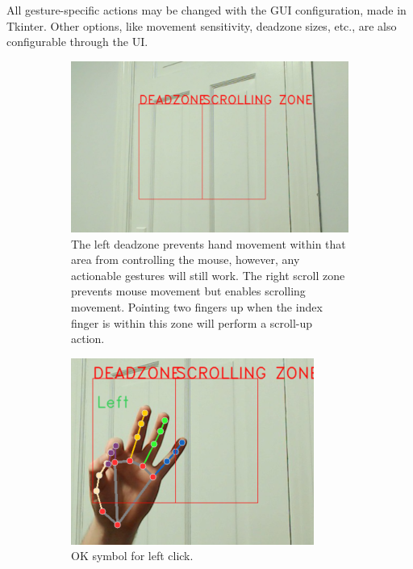 \documentclass{article}
\begin{document}
All gesture-specific actions may be changed with the GUI configuration, made in Tkinter. Other options, like movement sensitivity, deadzone sizes, etc., are also configurable through the UI.

\begin{figure}
    \centering
    \begin{subfigure}[T]{0.76\textwidth}
        \centering
        \includegraphics[width=.8\linewidth]{deadzone.png}
        \caption{The left deadzone prevents hand movement within that area from controlling the mouse, however, any actionable gestures will still work. The right scroll zone prevents mouse movement but enables scrolling movement. Pointing two fingers up when the index finger is within this zone will perform a scroll-up action.}
    \end{subfigure}
    \begin{subfigure}[T]{0.3\textwidth}
        \centering
        \includegraphics[width=.8\linewidth]{ok.png}
        \caption{OK symbol for left click.}
    \end{subfigure}\hfill
    \begin{subfigure}[T]{0.3\textwidth}

\end{subfigure}
\end{figure}
\end{document}
